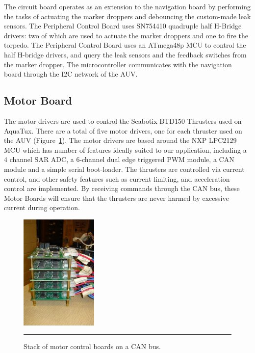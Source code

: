 The circuit board operates as an extension to the navigation board by
performing the tasks of actuating the marker droppers and debouncing
the custom-made leak sensors. The Peripheral Control Board uses
SN754410 quadruple half H-Bridge drivers: two of which are used to
actuate the marker droppers and one to fire the torpedo. The
Peripheral Control Board uses an ATmega48p MCU to control the half
H-bridge drivers, and query the leak sensors and the feedback switches
from the marker dropper. The microcontroller communicates with the
navigation board through the I2C network of the AUV.

\subsection{Motor Board}

The motor drivers are used to control the Seabotix BTD150 Thrusters
used on AquaTux.  There are a total of five motor drivers, one for
each thruster used on the AUV (Figure~\ref{mstack}). The motor drivers are based around the NXP
LPC2129 MCU which has number of features ideally suited to our
application, including a 4 channel SAR ADC, a 6-channel dual edge
triggered PWM module, a CAN module and a simple serial boot-loader.
The thrusters are controlled via current control, and other safety
features such as current limiting, and acceleration control are
implemented.  By receiving commands through the CAN bus, these Motor
Boards will ensure that the thrusters are never harmed by excessive
current during operation.

\begin{figure}
\begin{center}
 \includegraphics[width=1.5in]{fig/dsc06472} %
\vspace{.05in}
\hrule
\caption{Stack of motor control boards on a CAN bus.}\label{mstack}
\end{center}
\end{figure}


